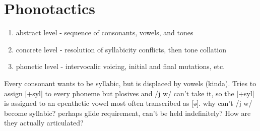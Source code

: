\documentclass[smallroyalvopaper,9pt]{memoir} %
\begin{document}

\section{Phonotactics}

\begin{enumerate}
    \item abstract level - sequence of consonants, vowels, and tones
    \item concrete level - resolution of syllabicity conflicts, then tone collation
    \item phonetic level - intervocalic voicing, initial and final mutations, etc.
\end{enumerate}

Every consonant wants to be syllabic, but is displaced by vowels (kinda).
Tries to assign [+syl] to every phoneme but plosives and /j w/ can't take it, so the [+syl] is assigned to an epenthetic vowel most often transcribed as [ə]. why can't /j w/ become syllabic? perhaps glide requirement, can't be held indefinitely? How are they actually articulated? 
\end{document}
